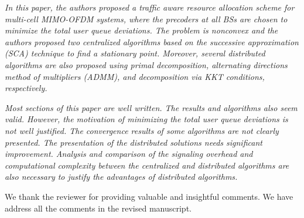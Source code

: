 \textit{In this paper, the authors proposed a traffic aware resource allocation scheme for multi-cell MIMO-OFDM systems, where the precoders at all BSs are chosen to minimize the total user queue deviations. The problem is nonconvex and the authors proposed two centralized algorithms based on the successive approximation (SCA) technique to find a stationary point. Moreover, several distributed algorithms are also proposed using primal decomposition, alternating directions method of multipliers (ADMM), and decomposition via KKT conditions, respectively.}

\textit{Most sections of this paper are well written. The results and algorithms also seem valid. However, the motivation of minimizing the total user queue deviations is not well justified. The convergence results of some algorithms are not clearly presented. The presentation of the distributed solutions needs significant improvement. Analysis and comparison of the signaling overhead and computational complexity between the centralized and distributed algorithms are also necessary to justify the advantages of distributed algorithms.}

We thank the reviewer for providing valuable and insightful comments. We have address all the comments in the revised manuscript.

